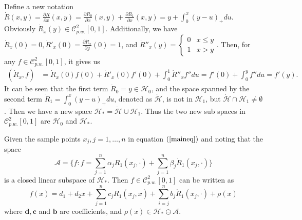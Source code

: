 Define a new notation $\dot{R}(x,y)=\frac{\partial R}{\partial x}(x,y)=\frac{\partial R_0}{\partial x}(x,y)+\frac{\partial R_1}{\partial x}(x,y)=y+\int_0^x(y-u)_+du$. Obviously $\dot{R}_x(y) \in \mathcal{C}_{p.w.}^{2}[0,1]$. Additionally, we have $\dot{R}_x(0)=0, \dot{R}'_x(0)=\frac{\partial \dot{R}_x}{\partial y}(0)=1$, and $ \dot{R}''_x(y)=\begin{cases}
0 & x\leq y \\ 1 & x>y \end{cases}$. Then, for any $f\in \mathcal{C}_{p.w.}^{2}[0,1]$, it gives us 
\begin{align*}
(\dot{R}_x,f) &=\dot{R}_x(0)f(0)+\dot{R}'_x(0)f'(0)+\int_0^1\dot{R}''_x f''	 du=f'(0)+\int_0^y f''du=f'(y).
\end{align*}
It can be seen that the first term $\dot{R}_0=y\in \mathcal{H}_0$, and the space spanned by the second term  $\dot{R}_1=\int_0^x(y-u)_+du$, denoted as $\mathcal{\dot{H}}$, is not in $\mathcal{H}_1$, but $\mathcal{\dot{H}} \cap \mathcal{H}_1\neq \emptyset$. Then we have a new space $\mathcal{H}_*=\mathcal{\dot{H}} \cup \mathcal{H}_1$. Thus the two new sub spaces in $\mathcal{C}_{p.w.}^2[0,1]$ are $\mathcal{H}_0$ and $\mathcal{H}_*$.



Given the sample points $x_j, j=1, \ldots, n$ in equation $(\ref{maineq})$ and noting that the space
\begin{equation}
\mathcal{A}=\{f: f=\sum_{j=1}^{n}\alpha_jR_1(x_j,\cdot)+\sum_{j=1}^{n}\beta_j\dot{R}_1(x_j,\cdot)\} 
\end{equation}
is a closed linear subspace of $\mathcal{H}_*$. Then $f  \in \mathcal{C}_{p.w.}^2[0,1]$ can be written as
\begin{equation}\label{etaeq}
f(x)=d_1+d_2x+\sum_{j=1}^{n}c_jR_1(x_j,x)+\sum_{i=j}^{n}b_j\dot{R}_1(x_j,\cdot) +\rho(x)
\end{equation}
where $\mathbf{d},\mathbf{c}$ and $\mathbf{b}$ are coefficients, and $\rho(x) \in \mathcal{H}_* \ominus \mathcal{A}$. 

